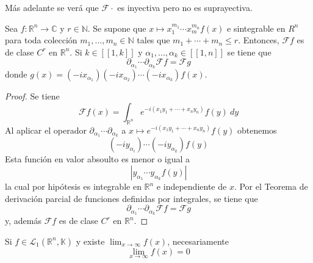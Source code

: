 \documentclass[12pt]{report}
\theoremstyle{largebreak}
\renewcommand{\leq}{\ensuremath{\leqslant}}
\newcommand\abs[1]{\ensuremath{\left|#1\right|}}
\newcommand\cf[3]{\ensuremath{#1:#2\rightarrow#3}}
\newcommand{\natint}[1]{\ensuremath{\left[\!\left[#1\right]\!\right]}}
\newcommand{\fou}[1]{\ensuremath{\mathcal{F}#1}}
\begin{document}
    \begin{obs}
        Más adelante se verá que $\fou{\cdot}$ es inyectiva pero no es suprayectiva.
    \end{obs}

    \begin{propo}
        Sea $\cf{f}{\mathbb{R}^n}{\mathbb{C}}$ y $r\in\mathbb{N}$. Se supone que $x\mapsto x_1^{m_1}\cdots x_m^{m_n}f(x)$ e sintegrable en $R^n$ para toda colección $m_1,...,m_n\in\mathbb{N}$ tales que $m_1+\cdots+m_n\leq r$. Entonces, $\fou{f}$ es de clase $C^r$ en $\mathbb{R}^n$. Si $k\in\natint{1,k}$ y $\alpha_1,...,\alpha_k\in\natint{1,n}$ se tiene que
        \begin{equation*}
            \partial_{\alpha_1}\cdots\partial_{\alpha_k}\fou{f}=\fou{g}
        \end{equation*}
        donde $g(x)=(-ix_{\alpha_1})(-ix_{\alpha_2})\cdots(-ix_{\alpha_k})f(x)$.
    \end{propo}

    \begin{proof}
        Se tiene
        \begin{equation*}
            \fou{f}(x)=\int_{\mathbb{R}^n}e^{ -i(x_1y_1+\cdots+x_ny_n)}f(y)\:dy
        \end{equation*}
        Al aplicar el operador $\partial_{\alpha_1}\cdots\partial_{\alpha_k}$ a $x\mapsto e^{ -i(x_1y_1+\cdots+x_ny_n)}f(y)$ obtenemos
        \begin{equation*}
            (-iy_{\alpha_i})\cdots(-iy_{\alpha_k})f(y)
        \end{equation*}
        Esta función en valor absoulto es menor o igual a
        \begin{equation*}
            \abs{y_{\alpha_1}\cdots y_{\alpha_k}f(y)}
        \end{equation*}
        la cual por hipótesis es integrable en $\mathbb{R}^n$ e independiente de $x$. Por el Teorema de derivación parcial de funciones definidas por integrales, se tiene que
        \begin{equation*}
            \partial_{\alpha_1}\cdots\partial_{\alpha_k}\fou{f}=\fou{g}
        \end{equation*}
        y, además $\fou{f}$ es de clase $C^r$ en $\mathbb{R}^n$.
    \end{proof}

    \begin{obs}
        Si $f\in\mathcal{L}_1(\mathbb{R}^n,\mathbb{K})$ y existe $\lim_{x\rightarrow\infty}f(x)$, necesariamente
        \begin{equation*}
            \lim_{x\rightarrow\infty}f(x)=0
        \end{equation*}
    \end{obs}
\end{document}
